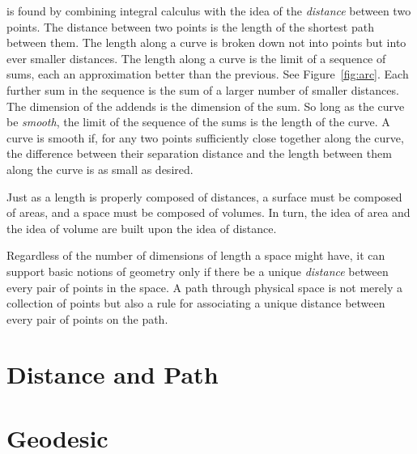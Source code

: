 \documentclass[nobib]{tufte-book}
\begin{document}
 is found by combining integral calculus with the idea
of the \emph{distance} between two points.  The distance between two points is
the length of the shortest path between them.  The length along a curve is
broken down not into points but into ever smaller distances.  The length along
a curve is the limit of a sequence of sums, each an approximation better than
the previous.  See Figure~\ref{fig:arc}.  Each further sum in the sequence is
the sum of a larger number of smaller distances.  The dimension of the addends
is the dimension of the sum.  So long as the curve be \emph{smooth}, the limit
of the sequence of the sums is the length of the curve.  A curve is smooth if,
for any two points sufficiently close together along the curve, the difference
between their separation distance and the length between them along the curve
is as small as desired.

Just as a length is properly composed of distances, a surface must be composed
of areas, and a space must be composed of volumes.  In turn, the idea of area
and the idea of volume are built upon the idea of distance.

Regardless of the number of dimensions of length a space might have, it can
support basic notions of geometry only if there be a unique \emph{distance}
between every pair of points in the space.  A path through physical space is
not merely a collection of points but also a rule for associating a unique
distance between every pair of points on the path.

\section{Distance and Path}

\section{Geodesic}

\appendix

\backmatter






\printindex
\end{document}
